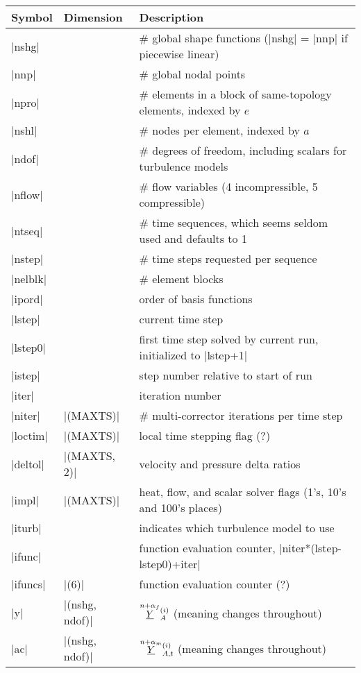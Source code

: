 \documentclass[11pt]{article}
\begin{document}
\begin{center}
\begin{tabular}{@{}lll@{}}
\toprule
Symbol & Dimension & Description \\
\midrule
|nshg|   &  & \# global shape functions (|nshg| = |nnp| if piecewise linear) \\
|nnp|    &  & \# global nodal points \\
|npro|   &  & \# elements in a block of same-topology elements, indexed by $e$ \\
|nshl|   &  & \# nodes per element, indexed by $a$ \\
|ndof|   &  & \# degrees of freedom, including scalars for turbulence models \\
|nflow|  &  & \# flow variables (4 incompressible, 5 compressible) \\
|ntseq|  &  & \# time sequences, which seems seldom used and defaults to 1 \\
|nstep|  &  & \# time steps requested per sequence \\
|nelblk| &  & \# element blocks \\
|ipord|  &  & order of basis functions \\
|lstep|  &  & current time step \\
|lstep0| &  & first time step solved by current run, initialized to |lstep+1| \\
|istep|  &  & step number relative to start of run \\
|iter|   &  & iteration number \\
|niter|  & |(MAXTS)|    & \# multi-corrector iterations per time step \\
|loctim| & |(MAXTS)|    & local time stepping flag (?) \\
|deltol| & |(MAXTS, 2)| & velocity and pressure delta ratios \\
|impl|   & |(MAXTS)|    & heat, flow, and scalar solver flags (1's, 10's and 100's places) \\
|iturb|  &  & indicates which turbulence model to use \\
|ifunc|  &  & function evaluation counter, |niter*(lstep-lstep0)+iter| \\
|ifuncs| & |(6)|						& function evaluation counter (?) \\
|y|      & |(nshg, ndof)|            & $\oset{n+\alpha_f}{\ul{Y}}_{A}^{(i)}$ (meaning changes throughout) \\
|ac|     & |(nshg, ndof)|            & $\oset{n+\alpha_m}{\ul{Y}}_{A,t}^{(i)}$ (meaning changes throughout) \\

\end{tabular}
\end{center}
\end{document}
